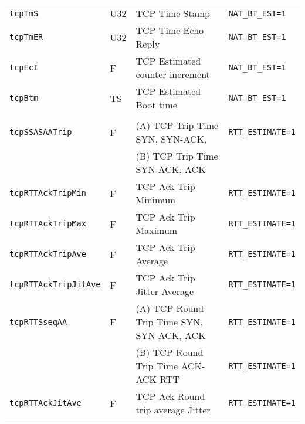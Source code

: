 \documentclass[documentation]{subfiles}
\begin{document}
\begin{longtable}{llll}

    {\tt tcpTmS}  & U32 & TCP Time Stamp                  & {\tt NAT\_BT\_EST=1}\\
    {\tt tcpTmER} & U32 & TCP Time Echo Reply             & {\tt NAT\_BT\_EST=1}\\
    {\tt tcpEcI}  & F   & TCP Estimated counter increment & {\tt NAT\_BT\_EST=1}\\
    {\tt tcpBtm}  & TS  & TCP Estimated Boot time         & {\tt NAT\_BT\_EST=1}\\\\


    {\tt tcpSSASAATrip}       & F & (A) TCP Trip Time SYN, SYN-ACK,           & {\tt RTT\_ESTIMATE=1}\\
                              &   & (B) TCP Trip Time SYN-ACK, ACK            &\\
    {\tt tcpRTTAckTripMin}    & F & TCP Ack Trip Minimum                      & {\tt RTT\_ESTIMATE=1}\\
    {\tt tcpRTTAckTripMax}    & F & TCP Ack Trip Maximum                      & {\tt RTT\_ESTIMATE=1}\\
    {\tt tcpRTTAckTripAve}    & F & TCP Ack Trip Average                      & {\tt RTT\_ESTIMATE=1}\\
    {\tt tcpRTTAckTripJitAve} & F & TCP Ack Trip Jitter Average               & {\tt RTT\_ESTIMATE=1}\\
    {\tt tcpRTTSseqAA}        & F & (A) TCP Round Trip Time SYN, SYN-ACK, ACK & {\tt RTT\_ESTIMATE=1}\\
                              &   & (B) TCP Round Trip Time ACK-ACK RTT       & {\tt RTT\_ESTIMATE=1}\\
    {\tt tcpRTTAckJitAve}     & F & TCP Ack Round trip average Jitter         & {\tt RTT\_ESTIMATE=1}\\
    \bottomrule
\end{longtable}
\end{document}
